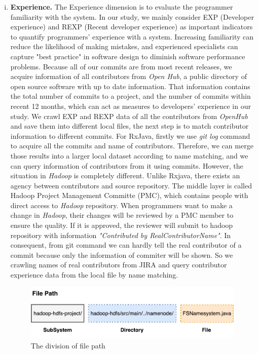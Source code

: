\begin{enumerate}[(i)]
	\item \noindent
	\textbf{Experience.}
	The Experience dimension is to evaluate the programmer familiarity with the system. In our study, we mainly consider EXP (Developer experience) and REXP (Recent developer experience) as important indicators to quantify programmers' experience with a system. Increasing familiarity can reduce the likelihood of making mistakes\cite{mockus2000predicting}, and experienced specialists can capture "best practice" in software design to diminish software performance problems\cite{smith2003more}. Because all of our commits are from most recent releases, we acquire information of all contributors from  \textit{Open Hub}, a public directory of open source software with up to date information. That information contains the total number of commits to a project, and the number of commits within recent 12 months, which can act as measures to developers' experience in our study. We crawl EXP and REXP data of all the contributors from \textit{OpenHub} and save them into different local files, the next step is to match contributor information to different commits. For RxJava, firstly we use \textit{git log} command to acquire all the commits and name of contributors. Therefore, we can merge those results into a larger local dataset according to name matching, and we can query information of contributors from it using commits. However, the situation in  \emph{Hadoop} is completely different. Unlike Rxjava, there exists an agency between contributors and source repository. The middle layer is called Hadoop Project Management Committe (PMC), which contains people with direct access to \emph{Hadoop} repository. When programmers want to make a change in \emph{Hadoop}, their changes will be reviewed by a PMC member to ensure the quality. If it is approved, the reviewer will submit to hadoop repository with information \textit{"Contributed by RealContributorName"}. In consequent, from git command we can hardly tell the real contributor of a commit because only the information of commiter will be shown. So we crawling names of real contributors from JIRA and query contributor experience data from the local file by name matching. 
	
	
	\begin{figure}
		\centering
		\includegraphics[width=\columnwidth]{Diffusion.pdf}
		\centering \caption{The division of file path}
		\label{fig:diffusion}
	\end{figure}
\end{enumerate}

